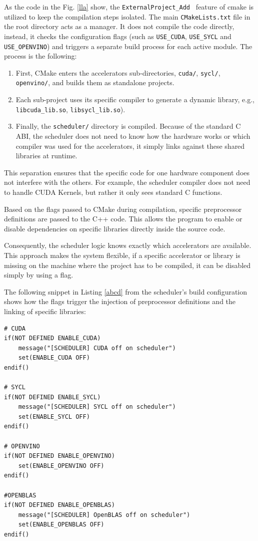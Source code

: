 As the code in the Fig. \ref{lla} show, the \texttt{ExternalProject\_Add } feature of cmake is utilized to keep the compilation steps isolated. The main \texttt{CMakeLists.txt} file in the root directory acts as a manager. It does not compile the code directly, instead, it checks the configuration flags (such as \texttt{USE\_CUDA}, \texttt{USE\_SYCL} and \texttt{USE\_OPENVINO}) and triggers a separate build process for each active module. The process is the following:

\begin{enumerate}
    \item  First, CMake enters the accelerators sub-directories, \texttt{cuda/}, \texttt{sycl/}, \texttt{openvino/}, and builds them as standalone projects.
    \item  Each sub-project uses its specific compiler to generate a dynamic library, e.g., \texttt{libcuda\_lib.so}, \texttt{libsycl\_lib.so}).
    \item  Finally, the \texttt{scheduler/} directory is compiled. Because of the standard C ABI, the scheduler does not need to know how the hardware works or which compiler was used for the accelerators, it simply links against these shared libraries at runtime.
\end{enumerate}

This separation ensures that the specific code for one hardware component does not interfere with the others. For example, the scheduler compiler does not need to handle CUDA Kernels, but rather it only sees standard C functions. 

Based on the flags passed to CMake during compilation, specific preprocessor definitions are passed to the C++ code. This allows the program to enable or disable dependencies on specific libraries directly inside the source code.

Consequently, the scheduler logic knows exactly which accelerators are available. This approach makes the system flexible, if a specific accelerator or library is missing on the machine where the project has to be compiled, it can be disabled simply by using a flag.

The following snippet in Listing \ref{abcd} from the scheduler's build configuration shows how the flags trigger the injection of preprocessor definitions and the linking of specific libraries:

\begin{lstlisting}[caption={Part of CMakeLists.txt inside the scheduler directory}, label={abcd}]
# CUDA
if(NOT DEFINED ENABLE_CUDA)
    message("[SCHEDULER] CUDA off on scheduler")
    set(ENABLE_CUDA OFF)
endif()

# SYCL 
if(NOT DEFINED ENABLE_SYCL) 
    message("[SCHEDULER] SYCL off on scheduler")
    set(ENABLE_SYCL OFF) 
endif()

# OPENVINO 
if(NOT DEFINED ENABLE_OPENVINO) 
    set(ENABLE_OPENVINO OFF) 
endif()

#OPENBLAS
if(NOT DEFINED ENABLE_OPENBLAS)
    message("[SCHEDULER] OpenBLAS off on scheduler")
    set(ENABLE_OPENBLAS OFF)
endif()
\end{lstlisting}
\label{code scheduler cmake}

